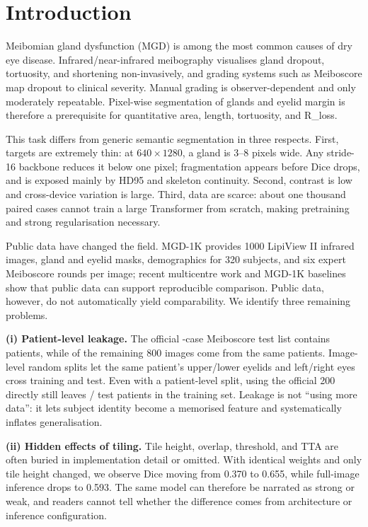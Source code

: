 \section{Introduction}\label{sec:intro}

Meibomian gland dysfunction (MGD) is among the most common causes of dry eye disease\cite{foulks2003,villani2020latest}. Infrared/near-infrared meibography visualises gland dropout, tortuosity, and shortening non-invasively, and grading systems such as Meiboscore map dropout to clinical severity\cite{wise2012meibography,ngo2014repeat}. Manual grading is observer-dependent and only moderately repeatable. Pixel-wise segmentation of glands and eyelid margin is therefore a prerequisite for quantitative area, length, tortuosity, and R\_loss.

This task differs from generic semantic segmentation in three respects. First, targets are extremely thin: at $640\times1280$, a gland is 3--8 pixels wide. Any stride-16 backbone reduces it below one pixel; fragmentation appears before Dice drops, and is exposed mainly by HD95 and skeleton continuity. Second, contrast is low and cross-device variation is large. Third, data are scarce: about one thousand paired cases cannot train a large Transformer from scratch, making pretraining and strong regularisation necessary\cite{saha2022automated,setu2021deep}.

Public data have changed the field. MGD-1K provides 1000 LipiView II infrared images, gland and eyelid masks, demographics for 320 subjects, and six expert Meiboscore rounds per image\cite{saha2022automated}; recent multicentre work and MGD-1K baselines show that public data can support reproducible comparison\cite{li2025multicenter,yu2025quantitative}. Public data, however, do not automatically yield comparability. We identify three remaining problems.

\textbf{(i) Patient-level leakage.} The official \officialTestImages-case Meiboscore test list contains \officialTestPatients{} patients, while \officialLeakImages{} of the remaining 800 images come from the same patients. Image-level random splits let the same patient's upper/lower eyelids and left/right eyes cross training and test. Even with a patient-level split, using the official 200 directly still leaves \officialLeakPatients/\officialTestPatients{} test patients in the training set. Leakage is not ``using more data'': it lets subject identity become a memorised feature and systematically inflates generalisation.

\textbf{(ii) Hidden effects of tiling.} Tile height, overlap, threshold, and TTA are often buried in implementation detail or omitted. With identical weights and only tile height changed, we observe Dice moving from 0.370 to 0.655, while full-image inference drops to 0.593. The same model can therefore be narrated as strong or weak, and readers cannot tell whether the difference comes from architecture or inference configuration.

